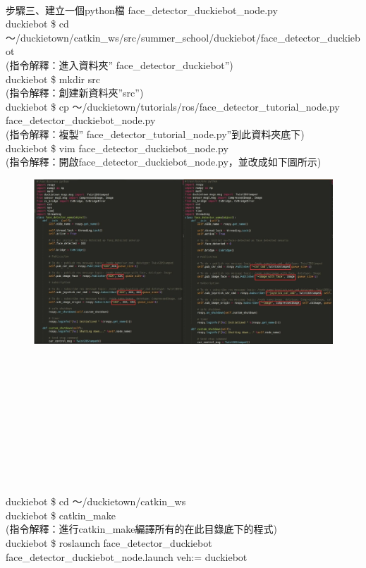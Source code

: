 \documentclass{article}
\begin{document}
\\
步驟三、建立一個python檔 face\_detector\_duckiebot\_node.py
\\duckiebot \$ cd ～/duckietown/catkin\_ws/src/summer\_school/duckiebot/face\_detector\_duckiebot
\\(指令解釋：進入資料夾” face\_detector\_duckiebot”)
\\duckiebot \$ mkdir src
\\(指令解釋：創建新資料夾”src”)
\\duckiebot \$ cp ～/duckietown/tutorials/ros/face\_detector\_tutorial\_node.py face\_detector\_duckiebot\_node.py
\\(指令解釋：複製” face\_detector\_tutorial\_node.py”到此資料夾底下)
\\duckiebot \$ vim face\_detector\_duckiebot\_node.py
\\(指令解釋：開啟face\_detector\_duckiebot\_node.py，並改成如下圖所示)
\begin{figure}[htp]
    \begin{center}
        \includegraphics[width=400pt]{pic/5_3_11.png}
    \end{center}
\end{figure}
\\\\\\\\\\\\\\\\\\
\\duckiebot \$ cd ～/duckietown/catkin\_ws
\\duckiebot \$ catkin\_make
\\(指令解釋：進行catkin\_make編譯所有的在此目錄底下的程式)
\\duckiebot \$ roslaunch face\_detector\_duckiebot face\_detector\_duckiebot\_node.launch veh:= duckiebot
\end{document}

